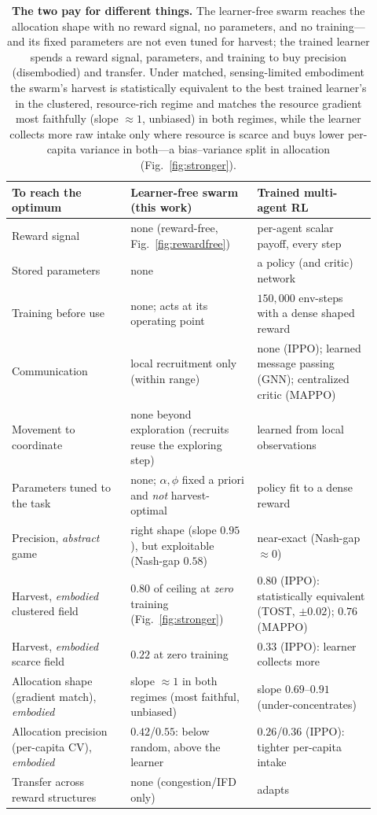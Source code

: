 \documentclass{article}
\begin{document}
\begin{table}[tbp]
\centering
{\small
\begin{tabular}{@{}p{0.30\linewidth}p{0.32\linewidth}p{0.30\linewidth}@{}}
\hline
\textbf{To reach the optimum} & \textbf{Learner-free swarm (this work)} & \textbf{Trained multi-agent RL} \\
\hline
Reward signal & none (reward-free, Fig.~\ref{fig:rewardfree}) & per-agent scalar payoff, every step \\
Stored parameters & none & a policy (and critic) network \\
Training before use & none; acts at its operating point & $150{,}000$ env-steps with a dense shaped reward \\
Communication & local recruitment only (within range) & none (IPPO); learned message passing (GNN); centralized critic (MAPPO) \\
Movement to coordinate & none beyond exploration (recruits reuse the exploring step) & learned from local observations \\
Parameters tuned to the task & none; $\alpha,\phi$ fixed a priori and \emph{not} harvest-optimal & policy fit to a dense reward \\
Precision, \emph{abstract} game & right shape (slope $0.95$), but exploitable (Nash-gap $0.58$) & near-exact (Nash-gap ${\approx}0$) \\
Harvest, \emph{embodied} clustered field & $0.80$ of ceiling at \emph{zero} training (Fig.~\ref{fig:stronger}) & $0.80$ (IPPO): statistically equivalent (TOST, $\pm0.02$); $0.76$ (MAPPO) \\
Harvest, \emph{embodied} scarce field & $0.22$ at zero training & $0.33$ (IPPO): learner collects more \\
Allocation shape (gradient match), \emph{embodied} & slope ${\approx}1$ in both regimes (most faithful, unbiased) & slope $0.69$--$0.91$ (under-concentrates) \\
Allocation precision (per-capita CV), \emph{embodied} & $0.42$/$0.55$: below random, above the learner & $0.26$/$0.36$ (IPPO): tighter per-capita intake \\
Transfer across reward structures & none (congestion/IFD only) & adapts \\
\hline
\end{tabular}}
\caption{\textbf{The two pay for different things.} The learner-free swarm reaches the allocation shape with no
reward signal, no parameters, and no training---and its fixed parameters are not even tuned for harvest; the
trained learner spends a reward signal, parameters, and training to buy precision (disembodied) and transfer.
Under matched, sensing-limited embodiment the swarm's harvest is statistically equivalent to the best trained
learner's in the clustered, resource-rich regime and matches the resource gradient most faithfully (slope
${\approx}1$, unbiased) in both regimes, while the learner collects more raw intake only where resource is scarce and buys
lower per-capita variance in both---a bias--variance split in allocation (Fig.~\ref{fig:stronger}).}
\label{tab:cost}
\end{table}
\end{document}

